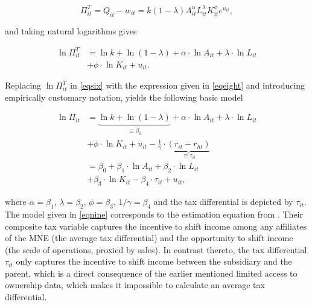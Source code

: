 \documentclass[10pt,twocolumn,oneside,cmyk]{article}
\begin{document}
\begin{equation}\label{eqseven}
 \Pi_{it}^T=Q_{it}-w_{it}=k(1-\lambda) A_{it}^\alpha L_{it}^\lambda K_{it}^\phi e^{u_{it}},
\end{equation}

and taking natural logarithms gives

\begin{equation}\label{eqeight}
 \begin{split}
  \ln \Pi_{it}^T &= \ln k+\ln (1-\lambda)+\alpha \cdot \ln A_{it} +\lambda \cdot \ln L_{it}\\
	&+ \phi \cdot \ln K_{it} + u_{it}.
 \end{split}
\end{equation}

Replacing $\ln \Pi_{it}^T$ in \cref{eqsix} with the expression given in \cref{eqeight} and introducing empirically customary notation, yields the following basic model

\begin{equation}\label{eqnine}
 \begin{split}
  \ln \Pi_{it} &= \underbrace{\ln k + \ln(1-\lambda)}_{\text{$\equiv \beta_0$}}+\alpha \cdot \ln A_{it} +\lambda \cdot \ln L_{it}\\
	&+ \phi \cdot \ln K_{it} + u_{it}-\frac{1}{\gamma}\cdot \underbrace{(r_{it}-r_{ht})}_{\text{$\equiv \tau_{it}$}}\\
	&= \beta_0+\beta_1 \cdot \ln A_{it}+\beta_2 \cdot \ln L_{it}\\
	&+ \beta_3 \cdot \ln K_{it} - \beta_4 \cdot \tau_{it} +u_{it},
 \end{split}
\end{equation}

where $\alpha=\beta_1$, $\lambda=\beta_2$, $\phi=\beta_3$, $1/\gamma=\beta_4$ and the tax differential is depicted by $\tau_{it}$. The model given in \cref{eqnine} corresponds to the estimation equation from \textcite[1169]{huizinga_international_2008}. Their composite tax variable captures the incentive to shift income among any affiliates of the MNE (the average tax differential) and the opportunity to shift income (the scale of operations, proxied by sales). In contrast thereto, the tax differential $\tau_{it}$ only captures the incentive to shift income between the subsidiary and the parent, which is a direct consequence of the earlier mentioned limited access to ownership data, which makes it impossible to calculate an average tax differential.
\end{document}
